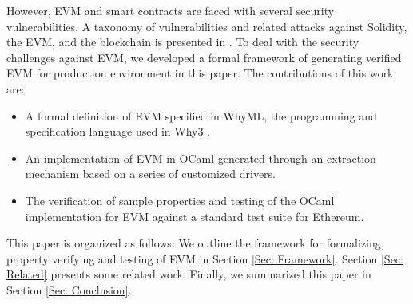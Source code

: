 \documentclass[runningheads]{llncs}
\begin{document}
However, EVM and smart contracts are faced with several security vulnerabilities. %
A taxonomy of vulnerabilities and related attacks against Solidity, the EVM, and the blockchain is presented in \cite{atzei2016survey}. 
To deal with the security challenges against EVM, we developed a formal framework of generating verified EVM for production environment in this paper. The contributions of this work are: 
\begin{itemize}
\item A formal definition of EVM specified in WhyML, the programming and specification language used in Why3 \cite{filliatre2013why3}. 
\item An implementation of EVM in OCaml generated through an extraction mechanism based on a series of customized drivers. 
\item The verification of sample properties and testing of the OCaml implementation for EVM against a standard test suite for Ethereum.
\end{itemize}

This paper is organized as follows: %
We outline the framework for formalizing, property verifying and testing of EVM in Section \ref{Sec: Framework}. %
Section \ref{Sec: Related} presents some related work. Finally, we summarized this paper %
in Section \ref{Sec: Conclusion}.
\end{document}
